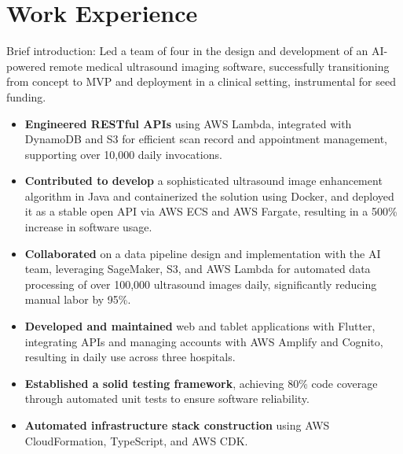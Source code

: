 \documentclass[10pt]{resume}
\begin{document}
\section{Work Experience}
Brief introduction: Led a team of four in the design and development of an AI-powered remote medical ultrasound
imaging software, successfully transitioning from concept to MVP and deployment in a clinical setting, instrumental for seed funding.
\begin{itemize}

\item \textbf{Engineered RESTful APIs} using AWS Lambda, integrated with DynamoDB and S3 for efficient scan record and appointment management, supporting over 10,000 daily invocations.

\item \textbf{Contributed to develop} a sophisticated ultrasound image enhancement algorithm in Java and containerized the solution using Docker, and deployed it as a stable open API via AWS ECS and AWS Fargate, resulting in a 500\% increase in software usage.

\item \textbf{Collaborated} on a data pipeline design and implementation with the AI team, leveraging SageMaker, S3, and AWS Lambda for automated data processing of over 100,000 ultrasound images daily, significantly reducing manual
labor by 95\%.

\item \textbf{Developed and maintained} web and tablet applications with Flutter, integrating APIs and managing accounts with AWS Amplify and Cognito, resulting in daily use across three hospitals.

\item \textbf{Established a solid testing framework}, achieving 80\% code coverage through automated unit tests to ensure software reliability.

\item \textbf{Automated infrastructure stack construction}  using AWS CloudFormation, TypeScript, and AWS CDK.

\end{itemize}
\end{document}
